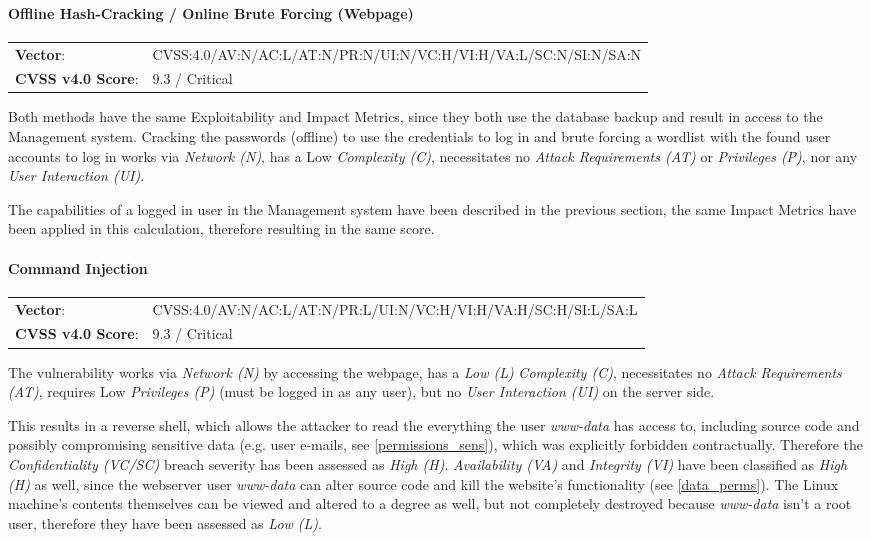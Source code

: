 \documentclass[../report.tex]{subfiles}
\begin{document}
\paragraph{Offline Hash-Cracking / Online Brute Forcing (Webpage)}
\begin{tabular}{l l}
\textbf{Vector}: & CVSS:4.0/AV:N/AC:L/AT:N/PR:N/UI:N/VC:H/VI:H/VA:L/SC:N/SI:N/SA:N\\
\textbf{CVSS v4.0 Score}: & 9.3 / Critical\\
\end{tabular}

Both methods have the same Exploitability and Impact Metrics, since they both use the database backup and result in access to the Management system. 
Cracking the passwords (offline) to use the credentials to log in and brute forcing a wordlist with the found user accounts to log in works via \textit{Network (N)}, has a Low \textit{Complexity (C)}, necessitates no \textit{Attack Requirements (AT)} or \textit{Privileges (P)}, nor any \textit{User Interaction (UI)}.

The capabilities of a logged in user in the Management system have been described in the previous section, the same Impact Metrics have been applied in this calculation, therefore resulting in the same score.

\paragraph{Command Injection}
\begin{tabular}{l l}
\textbf{Vector}: & CVSS:4.0/AV:N/AC:L/AT:N/PR:L/UI:N/VC:H/VI:H/VA:H/SC:H/SI:L/SA:L\\
\textbf{CVSS v4.0 Score}: & 9.3 / Critical\\
\end{tabular}

The vulnerability works via \textit{Network (N)} by accessing the webpage, has a \textit{Low (L)} \textit{Complexity (C)}, necessitates no \textit{Attack Requirements (AT)}, requires Low \textit{Privileges (P)} (must be logged in as any user), but no \textit{User Interaction (UI)} on the server side.

This results in a reverse shell, which allows the attacker to read the everything the user \textit{www-data} has access to, including source code and possibly compromising sensitive data (e.g. user e-mails, see \cref{permissions_sens}), which was explicitly forbidden contractually. Therefore the \textit{Confidentiality (VC/SC)} breach severity has been assessed as \textit{High (H)}. \textit{Availability (VA)} and \textit{Integrity (VI)} have been classified as \textit{High (H)} as well, since the webserver user \textit{www-data} can alter source code and kill the website's functionality (see \cref{data_perms}). The Linux machine's contents themselves can be viewed and altered to a degree as well, but not completely destroyed because \textit{www-data} isn't a root user, therefore they have been assessed as \textit{Low (L)}.
\end{document}

